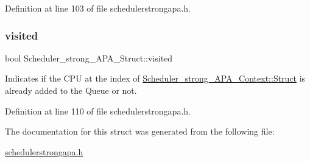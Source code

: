 Definition at line 103 of file schedulerstrongapa.\+h.

\mbox{\label{structScheduler__strong__APA__Struct_ab611e883dcef8c5226f00c734876b132}} 
\subsubsection{\texorpdfstring{visited}{visited}}
{\footnotesize\ttfamily bool Scheduler\+\_\+strong\+\_\+\+A\+P\+A\+\_\+\+Struct\+::visited}



Indicates if the C\+PU at the index of \hyperlink{structScheduler__strong__APA__Context_ac25debff84510636df8e42c5750ace15}{Scheduler\+\_\+strong\+\_\+\+A\+P\+A\+\_\+\+Context\+::\+Struct} is already added to the Queue or not. 



Definition at line 110 of file schedulerstrongapa.\+h.



The documentation for this struct was generated from the following file\+:\begin{DoxyCompactItemize}
\item 
\hyperlink{schedulerstrongapa_8h}{schedulerstrongapa.\+h}\end{DoxyCompactItemize}
